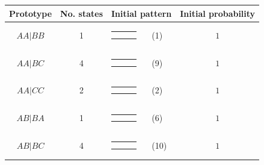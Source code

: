 \documentclass[9pt,letterpaper,twoside]{article}
\begin{document}
{
\begin{center}
\begin{tabular}{ccrlc} \hline
Prototype & No. states & \multicolumn{2}{c}{Initial pattern} & Initial probability \\ \hline
$AA|BB$ & 1 & 
{\renewcommand{\arraystretch}{0.3}
\renewcommand{\tabcolsep}{0.5mm}
\parbox[b][3mm][c]{12mm}{
\begin{tabular}{|p{2mm}|p{2mm}||p{2mm}|} \hline
$\bullet$ & $\circ  $ &           \\
$\bullet$ & $\circ  $ &           \\ \hline
\end{tabular}}}
& (1) & $1$ \\
$AA|BC$ & 4 & 
{\renewcommand{\arraystretch}{0.3}
\renewcommand{\tabcolsep}{0.5mm}
\parbox[b][3mm][c]{12mm}{
\begin{tabular}{|p{2mm}|p{2mm}||p{2mm}|} \hline
$\bullet$ & $\circ  $ &           \\
$\bullet$ &           & $\circ  $ \\ \hline
\end{tabular}}}
& (9) & $1$ \\
$AA|CC$ & 2 & 
{\renewcommand{\arraystretch}{0.3}
\renewcommand{\tabcolsep}{0.5mm}
\parbox[b][3mm][c]{12mm}{
\begin{tabular}{|p{2mm}|p{2mm}||p{2mm}|} \hline
$\bullet$ &           & $\circ  $ \\
$\bullet$ &           & $\circ  $ \\ \hline
\end{tabular}}}
& (2) & $1$ \\
$AB|BA$ & 1 & 
{\renewcommand{\arraystretch}{0.3}
\renewcommand{\tabcolsep}{0.5mm}
\parbox[b][3mm][c]{12mm}{
\begin{tabular}{|p{2mm}|p{2mm}||p{2mm}|} \hline
$\bullet$ & $\circ  $ &           \\
$\circ  $ & $\bullet$ &           \\ \hline
\end{tabular}}}
& (6) & $1$ \\
$AB|BC$ & 4 & 
{\renewcommand{\arraystretch}{0.3}
\renewcommand{\tabcolsep}{0.5mm}
\parbox[b][3mm][c]{12mm}{
\begin{tabular}{|p{2mm}|p{2mm}||p{2mm}|} \hline
$\bullet$ & $\circ  $ &           \\
          & $\bullet$ & $\circ  $ \\ \hline
\end{tabular}}}
& (10) & $1$ \\

\end{tabular}
\end{center}}
\end{document}
